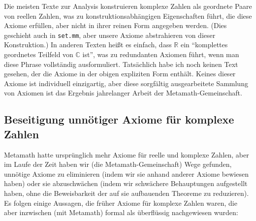Die meisten Texte zur Analysis konstruieren komplexe Zahlen als geordnete Paare von reellen Zahlen, was zu konstruktionsabhängigen Eigenschaften führt, die diese Axiome erfüllen, aber nicht in ihrer reinen Form angegeben werden.  (Dies geschieht auch in \texttt{set.mm}, aber unsere Axiome abstrahieren von dieser Konstruktion.) In anderen Texten heißt es einfach, dass $\mathbb{R}$ ein "`komplettes geordnetes Teilfeld von $\mathbb{C}$ ist"', was zu redundanten Axiomen führt, wenn man diese Phrase vollständig ausformuliert.  Tatsächlich habe ich noch keinen Text gesehen, der die Axiome in der obigen expliziten Form enthält. Keines dieser Axiome ist individuell einzigartig, aber diese sorgfältig ausgearbeitete Sammlung von Axiomen ist das Ergebnis jahrelanger Arbeit der Metamath-Gemeinschaft.

\subsection{Beseitigung unnötiger Axiome für komplexe \texorpdfstring{\\}{}Zahlen}

Metamath hatte ursprünglich mehr Axiome für reelle und komplexe Zahlen, aber im Laufe der Zeit haben wir (die Metamath-Gemeinschaft) Wege gefunden, unnötige Axiome zu eliminieren (indem wir sie anhand anderer Axiome bewiesen haben) oder sie abzuschwächen (indem wir schwächere Behauptungen aufgestellt haben, ohne die Beweisbarkeit der auf sie aufbauenden Theoreme zu reduzieren). Es folgen einige Aussagen, die früher Axiome für komplexe Zahlen waren, die aber inzwischen (mit Metamath) formal als überflüssig nachgewiesen wurden:

